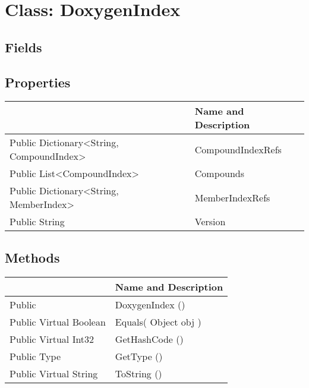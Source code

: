 \documentclass[11pt, oneside, a4paper]{book}
\begin{document}
\hypertarget{SoftwareEngineeringTools.{}Documentation.{}DoxygenIndex}{}
\section{Class: DoxygenIndex}

\subsection{Fields}

\subsection{Properties}
\begin{center}
\begin{tabular}{| p{3cm} | p{12cm} | }
\hline
\textbf{ } & \textbf{ Name and Description}\\
\hline
 Public  Dictionary<String, CompoundIndex> &  CompoundIndexRefs\hypertarget{SoftwareEngineeringTools.{}Documentation.{}DoxygenIndex.{}CompoundIndexRefs}{}\\
\hline
 Public  List<CompoundIndex> &  Compounds\hypertarget{SoftwareEngineeringTools.{}Documentation.{}DoxygenIndex.{}Compounds}{}\\
\hline
 Public  Dictionary<String, MemberIndex> &  MemberIndexRefs\hypertarget{SoftwareEngineeringTools.{}Documentation.{}DoxygenIndex.{}MemberIndexRefs}{}\\
\hline
 Public  String &  Version\hypertarget{SoftwareEngineeringTools.{}Documentation.{}DoxygenIndex.{}Version}{}\\
\hline
\end{tabular}
\end{center}

\subsection{Methods}
\begin{center}
\begin{tabular}{| p{3cm} | p{12cm} | }
\hline
\textbf{ } & \textbf{ Name and Description}\\
\hline
 Public  &  DoxygenIndex ()\hypertarget{SoftwareEngineeringTools.{}Documentation.{}DoxygenIndex.{}DoxygenIndex}{}\\
\hline
 Public  Virtual  Boolean &  Equals(\hypertarget{SoftwareEngineeringTools.{}Documentation.{}DoxygenIndex.{}Equals\_Object}{} Object  obj  )\\
\hline
 Public  Virtual  Int32 &  GetHashCode ()\hypertarget{SoftwareEngineeringTools.{}Documentation.{}DoxygenIndex.{}GetHashCode}{}\\
\hline
 Public  Type &  GetType ()\hypertarget{SoftwareEngineeringTools.{}Documentation.{}DoxygenIndex.{}GetType}{}\\
\hline
 Public  Virtual  String &  ToString ()\hypertarget{SoftwareEngineeringTools.{}Documentation.{}DoxygenIndex.{}ToString}{}\\
\hline
\end{tabular}
\end{center}
 
\end{document}

